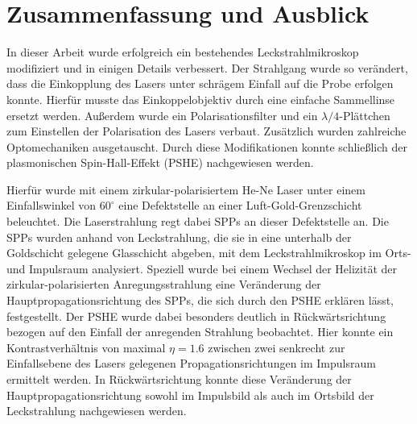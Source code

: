 \documentclass[titlepage,  ngerman]{article}
\begin{document}
	\newpage
	\section{Zusammenfassung und Ausblick}
	In dieser Arbeit wurde erfolgreich ein bestehendes Leckstrahlmikroskop modifiziert und in einigen Details verbessert. Der Strahlgang wurde so verändert, dass die Einkopplung des Lasers unter schrägem Einfall auf die Probe erfolgen konnte. Hierfür musste das Einkoppelobjektiv durch eine einfache Sammellinse ersetzt werden. Außerdem wurde ein Polarisationsfilter und ein $\lambda/4$-Plättchen zum Einstellen der Polarisation des Lasers verbaut. Zusätzlich wurden zahlreiche Optomechaniken ausgetauscht. Durch diese Modifikationen konnte schließlich der plasmonischen Spin-Hall-Effekt (PSHE) nachgewiesen werden.
	
	Hierfür wurde mit einem zirkular-polarisiertem He-Ne Laser unter einem Einfallswinkel von $60^\circ$ eine Defektstelle an einer Luft-Gold-Grenzschicht beleuchtet. Die Laserstrahlung regt dabei SPPs an dieser Defektstelle an. Die SPPs wurden anhand von Leckstrahlung, die sie in eine unterhalb der Goldschicht gelegene Glasschicht abgeben, mit dem Leckstrahlmikroskop im Orts- und Impulsraum analysiert. Speziell wurde bei einem Wechsel der Helizität der zirkular-polarisierten Anregungsstrahlung eine Veränderung der Hauptpropagationsrichtung des SPPs, die sich durch den PSHE erklären lässt, festgestellt. Der PSHE wurde dabei besonders deutlich in Rückwärtsrichtung bezogen auf den Einfall der anregenden Strahlung beobachtet. Hier konnte ein Kontrastverhältnis von maximal $\eta = 1.6$ zwischen zwei senkrecht zur Einfallsebene des Lasers gelegenen Propagationsrichtungen im Impulsraum ermittelt werden. In Rückwärtsrichtung konnte diese Veränderung der Hauptpropagationsrichtung sowohl im Impulsbild als auch im Ortsbild der Leckstrahlung nachgewiesen werden. 
		
\end{document}
